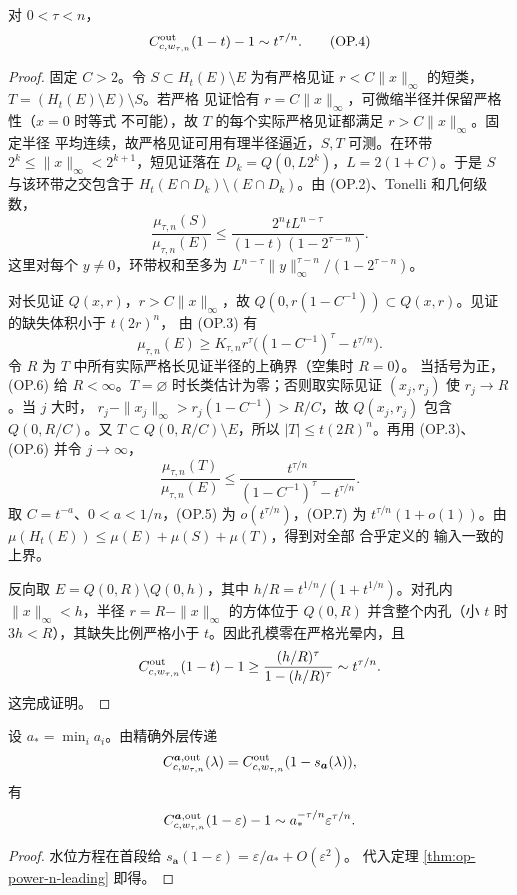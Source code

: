 \begin{theorem}[一般维数的首项]\label{thm:op-power-n-leading}
对 $0<\tau<n$，
\[C^{\rm out}_{c,w_{\tau,n}}(1-t)-1\sim t^{\tau/n}.\tag{OP.4}\]
\end{theorem}
\begin{proof}
固定 $C>2$。令 $S\subset H_t(E)\setminus E$ 为有严格见证
$r<C\|x\|_\infty$ 的短类，$T=(H_t(E)\setminus E)\setminus S$。若严格
见证恰有 $r=C\|x\|_\infty$，可微缩半径并保留严格性（$x=0$ 时等式
不可能），故 $T$ 的每个实际严格见证都满足 $r>C\|x\|_\infty$。固定半径
平均连续，故严格见证可用有理半径逼近，$S,T$ 可测。在环带
$2^k\le\|x\|_\infty<2^{k+1}$，短见证落在
$D_k=Q(0,L2^k)$，$L=2(1+C)$。于是 $S$ 与该环带之交包含于
$H_t(E\cap D_k)\setminus(E\cap D_k)$。由 (OP.2)、Tonelli 和几何级数，
\[\frac{\mu_{\tau,n}(S)}{\mu_{\tau,n}(E)}
\le\frac{2^ntL^{n-\tau}}{(1-t)(1-2^{\tau-n})}.\tag{OP.5}\]
这里对每个 $y\ne0$，环带权和至多为
$L^{n-\tau}\|y\|_\infty^{\tau-n}/(1-2^{\tau-n})$。

对长见证 $Q(x,r)$，$r>C\|x\|_\infty$，故
$Q(0,r(1-C^{-1}))\subset Q(x,r)$。见证的缺失体积小于 $t(2r)^n$，
由 (OP.3) 有
\[\mu_{\tau,n}(E)\ge K_{\tau,n}r^\tau\bigl((1-C^{-1})^\tau-t^{\tau/n}\bigr).\tag{OP.6}\]
令 $R$ 为 $T$ 中所有实际严格长见证半径的上确界（空集时 $R=0$）。
当括号为正，(OP.6) 给 $R<\infty$。$T=\varnothing$ 时长类估计为零；否则取实际见证 $(x_j,r_j)$ 使
$r_j\to R$。当 $j$ 大时，
$r_j-\|x_j\|_\infty>r_j(1-C^{-1})>R/C$，故
$Q(x_j,r_j)$ 包含 $Q(0,R/C)$。又 $T\subset Q(0,R/C)\setminus E$，所以
$|T|\le t(2R)^n$。再用 (OP.3)、(OP.6) 并令 $j\to\infty$，
\[\frac{\mu_{\tau,n}(T)}{\mu_{\tau,n}(E)}
\le\frac{t^{\tau/n}}{(1-C^{-1})^\tau-t^{\tau/n}}.\tag{OP.7}\]
取 $C=t^{-a}$、$0<a<1/n$，(OP.5) 为 $o(t^{\tau/n})$，(OP.7) 为
$t^{\tau/n}(1+o(1))$。由 $\mu(H_t(E))\le\mu(E)+\mu(S)+\mu(T)$，得到对全部 合乎定义的 输入一致的上界。

反向取 $E=Q(0,R)\setminus Q(0,h)$，其中
$h/R=t^{1/n}/(1+t^{1/n})$。对孔内 $\|x\|_\infty<h$，半径
$r=R-\|x\|_\infty$ 的方体位于 $Q(0,R)$ 并含整个内孔（小 $t$ 时
$3h<R$），其缺失比例严格小于 $t$。因此孔模零在严格光晕内，且
\[C^{\rm out}_{c,w_{\tau,n}}(1-t)-1\ge
\frac{(h/R)^\tau}{1-(h/R)^\tau}\sim t^{\tau/n}.\]
这完成证明。
\end{proof}

\begin{corollary}[共同中心多集合外层模型]\label{cor:op-power-multi}
设 $a_*=\min_i a_i$。由精确外层传递
\[C^{\boldsymbol a,\rm out}_{c,w_{\tau,n}}(\lambda)=C^{\rm out}_{c,w_{\tau,n}}(1-s_{\boldsymbol a}(\lambda)),\]
有
\[C^{\boldsymbol a,\rm out}_{c,w_{\tau,n}}(1-\varepsilon)-1\sim
a_*^{-\tau/n}\varepsilon^{\tau/n}.\]
\end{corollary}
\begin{proof}
水位方程在首段给 $s_{\boldsymbol a}(1-\varepsilon)=\varepsilon/a_*+O(\varepsilon^2)$。
代入定理 \ref{thm:op-power-n-leading} 即得。
\end{proof}
